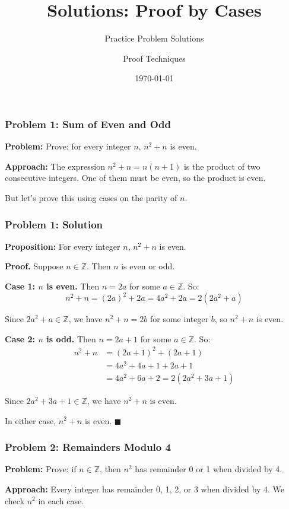 \documentclass{beamer}
\title{Solutions: Proof by Cases}
\subtitle{Practice Problem Solutions}
\author{Proof Techniques}
\date{\today}
\begin{document}
\frame{\titlepage}

\begin{frame}
  \frametitle{Problem 1: Sum of Even and Odd}

  {\color{maroon}\textbf{Problem:}} Prove: for every integer $n$, $n^2 + n$ is even.

  \vspace{0.3cm}
  {\color{maroon}\textbf{Approach:}} The expression $n^2 + n = n(n+1)$ is the product of two consecutive integers. One of them must be even, so the product is even. 
  
  But let's prove this using cases on the parity of $n$.
\end{frame}

\begin{frame}
  \frametitle{Problem 1: Solution}

  {\color{maroon}\textbf{Proposition:}} For every integer $n$, $n^2 + n$ is even.

  \vspace{0.2cm}
  {\color{darkmaroon}\textbf{Proof.}} Suppose $n \in \mathbb{Z}$. Then $n$ is even or odd.

  \vspace{0.2cm}
  \textbf{Case 1: $n$ is even.} Then $n = 2a$ for some $a \in \mathbb{Z}$. So:
  $$n^2 + n = (2a)^2 + 2a = 4a^2 + 2a = 2(2a^2 + a)$$
  
  Since $2a^2 + a \in \mathbb{Z}$, we have $n^2 + n = 2b$ for some integer $b$, so $n^2 + n$ is even.

  \vspace{0.3cm}
  \textbf{Case 2: $n$ is odd.} Then $n = 2a + 1$ for some $a \in \mathbb{Z}$. So:
  \begin{align*}
    n^2 + n &= (2a+1)^2 + (2a+1) \\
    &= 4a^2 + 4a + 1 + 2a + 1 \\
    &= 4a^2 + 6a + 2 = 2(2a^2 + 3a + 1)
  \end{align*}

  Since $2a^2 + 3a + 1 \in \mathbb{Z}$, we have $n^2 + n$ is even.

  \vspace{0.2cm}
  In either case, $n^2 + n$ is even. \hfill $\blacksquare$
\end{frame}

\begin{frame}
  \frametitle{Problem 2: Remainders Modulo 4}

  {\color{maroon}\textbf{Problem:}} Prove: if $n \in \mathbb{Z}$, then $n^2$ has remainder 0 or 1 when divided by 4.

  \vspace{0.3cm}
  {\color{maroon}\textbf{Approach:}} Every integer has remainder 0, 1, 2, or 3 when divided by 4. We check $n^2$ in each case.
\end{frame}
\end{document}
